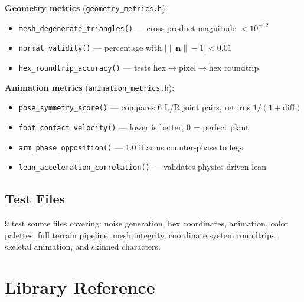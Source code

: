 \documentclass[11pt,a4paper]{article}
\begin{document}
\textbf{Geometry metrics} (\texttt{geometry\_metrics.h}):
\begin{itemize}
  \item \texttt{mesh\_degenerate\_triangles()} --- cross product magnitude $< 10^{-12}$
  \item \texttt{normal\_validity()} --- percentage with $|\|\mathbf{n}\| - 1| < 0.01$
  \item \texttt{hex\_roundtrip\_accuracy()} --- tests hex$\to$pixel$\to$hex roundtrip
\end{itemize}

\textbf{Animation metrics} (\texttt{animation\_metrics.h}):
\begin{itemize}
  \item \texttt{pose\_symmetry\_score()} --- compares 6 L/R joint pairs, returns $1/(1+\text{diff})$
  \item \texttt{foot\_contact\_velocity()} --- lower is better, 0 = perfect plant
  \item \texttt{arm\_phase\_opposition()} --- 1.0 if arms counter-phase to legs
  \item \texttt{lean\_acceleration\_correlation()} --- validates physics-driven lean
\end{itemize}

\subsection{Test Files}

9 test source files covering: noise generation, hex coordinates, animation, color palettes, full terrain pipeline, mesh integrity, coordinate system roundtrips, skeletal animation, and skinned characters.

\section{Library Reference}
\label{sec:libref}
\end{document}
